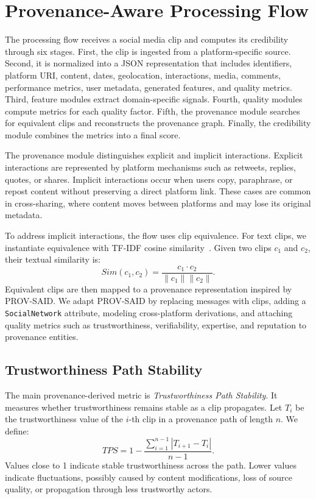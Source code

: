 \documentclass[sigconf, nonacm]{acmart}
\begin{document}
\section{Provenance-Aware Processing Flow}

The processing flow receives a social media clip and computes its credibility
through six stages. First, the clip is ingested from a platform-specific source.
Second, it is normalized into a JSON representation that includes identifiers,
platform URI, content, dates, geolocation, interactions, media, comments,
performance metrics, user metadata, generated features, and quality metrics.
Third, feature modules extract domain-specific signals. Fourth, quality modules
compute metrics for each quality factor. Fifth, the provenance module searches for
equivalent clips and reconstructs the provenance graph. Finally, the credibility
module combines the metrics into a final score.

The provenance module distinguishes explicit and implicit interactions. Explicit
interactions are represented by platform mechanisms such as retweets, replies,
quotes, or shares. Implicit interactions occur when users copy, paraphrase, or
repost content without preserving a direct platform link. These cases are common
in cross-sharing, where content moves between platforms and may lose its original
metadata.

To address implicit interactions, the flow uses clip equivalence. For text clips,
we instantiate equivalence with TF-IDF cosine similarity~\cite{Yuntao2005}. Given
two clips $c_1$ and $c_2$, their textual similarity is:
\begin{equation}
  Sim(c_1,c_2) = \frac{c_1 \cdot c_2}{\|c_1\|\|c_2\|}.
\end{equation}
Equivalent clips are then mapped to a provenance representation inspired by
PROV-SAID. We adapt PROV-SAID by replacing messages with clips, adding a
\texttt{SocialNetwork} attribute, modeling cross-platform derivations, and
attaching quality metrics such as trustworthiness, verifiability, expertise, and
reputation to provenance entities.

\subsection{Trustworthiness Path Stability}

The main provenance-derived metric is \emph{Trustworthiness Path Stability}. It
measures whether trustworthiness remains stable as a clip propagates. Let
$T_i$ be the trustworthiness value of the $i$-th clip in a provenance path of
length $n$. We define:
\begin{equation}
  TPS = 1 - \frac{\sum_{i=1}^{n-1}|T_{i+1}-T_i|}{n-1}.
\end{equation}
Values close to 1 indicate stable trustworthiness across the path. Lower values
indicate fluctuations, possibly caused by content modifications, loss of source
quality, or propagation through less trustworthy actors.
\end{document}
